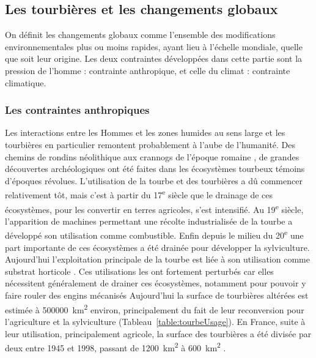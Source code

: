 \subsection{Les tourbières et les changements globaux}
On définit les changements globaux comme l'ensemble des modifications environnementales plus ou moins rapides, ayant lieu à l'échelle mondiale, quelle que soit leur origine. Les deux contraintes développées dans cette partie sont la pression de l'homme : contrainte anthropique, et celle du climat : contrainte climatique.

\subsubsection{Les contraintes anthropiques}

Les interactions entre les Hommes et les zones humides au sens large et les tourbières en particulier remontent probablement à l'aube de l'humanité.
Des chemins de rondins néolithique aux crannogs de l'époque romaine \citep{buckland1993}, de grandes découvertes archéologiques ont été faites dans les écosystèmes tourbeux témoins d'époques révolues.
L’utilisation de la tourbe et des tourbières a dû commencer relativement tôt, mais c'est à partir du 17\textsuperscript{e} siècle que le drainage de ces écosystèmes, pour les convertir en terres agricoles, s'est intensifié.
Au 19\textsuperscript{e} siècle, l'apparition de machines permettant une récolte industrialisée de la tourbe a développé son utilisation comme combustible.
Enfin depuis le milieu du 20\textsuperscript{e} une part importante de ces écosystèmes a été drainée pour développer la sylviculture.
Aujourd'hui l'exploitation principale de la tourbe est liée à son utilisation comme substrat horticole \citep{lappalainen1996,chapman2003}.
Ces utilisations les ont fortement perturbés car elles nécessitent généralement de drainer ces écosystèmes, notamment pour pouvoir y faire rouler des engins mécanisés
Aujourd'hui la surface de tourbières altérées est estimée à \SI{500000}{\square\kilo\metre} environ, principalement du fait de leur reconversion pour l'agriculture et la sylviculture (Tableau~\ref{table:tourbeUsage}).
En France, suite à leur utilisation, principalement agricole, la surface des tourbières a été divisée par deux entre 1945 et 1998, passant de \SI{1200}{\square\kilo\meter} à \SI{600}{\square\kilo\meter} \citep{lappalainen1996,manneville1999}.

